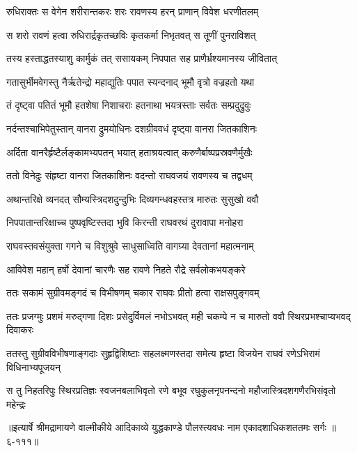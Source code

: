 \twolineshloka
{रुधिराक्तः स वेगेन शरीरान्तकरः शरः}
{रावणस्य हरन् प्राणान् विवेश धरणीतलम्} %

\twolineshloka
{स शरो रावणं हत्वा रुधिरार्द्रकृतच्छविः}
{कृतकर्मा निभृतवत् स तूणीं पुनराविशत्} %

\twolineshloka
{तस्य हस्ताद्धतस्याशु कार्मुकं तत् ससायकम्}
{निपपात सह प्राणैर्भ्रश्यमानस्य जीवितात्} %

\twolineshloka
{गतासुर्भीमवेगस्तु नैर्ऋतेन्द्रो महाद्युतिः}
{पपात स्यन्दनाद् भूमौ वृत्रो वज्रहतो यथा} %

\twolineshloka
{तं दृष्ट्वा पतितं भूमौ हतशेषा निशाचराः}
{हतनाथा भयत्रस्ताः सर्वतः सम्प्रदुद्रुवुः} %

\twolineshloka
{नर्दन्तश्चाभिपेतुस्तान् वानरा द्रुमयोधिनः}
{दशग्रीववधं दृष्ट्वा वानरा जितकाशिनः} %

\twolineshloka
{अर्दिता वानरैर्हृष्टैर्लङ्कामभ्यपतन् भयात्}
{हताश्रयत्वात् करुणैर्बाष्पप्रस्रवणैर्मुखैः} %

\twolineshloka
{ततो विनेदुः संहृष्टा वानरा जितकाशिनः}
{वदन्तो राघवजयं रावणस्य च तद्वधम्} %

\twolineshloka
{अथान्तरिक्षे व्यनदत् सौम्यस्त्रिदशदुन्दुभिः}
{दिव्यगन्धवहस्तत्र मारुतः सुसुखो ववौ} %

\twolineshloka
{निपपातान्तरिक्षाच्च पुष्पवृष्टिस्तदा भुवि}
{किरन्ती राघवरथं दुरावापा मनोहरा} %

\twolineshloka
{राघवस्तवसंयुक्ता गगने च विशुश्रुवे}
{साधुसाध्विति वागग्र्या देवतानां महात्मनाम्} %

\twolineshloka
{आविवेश महान् हर्षो देवानां चारणैः सह}
{रावणे निहते रौद्रे सर्वलोकभयङ्करे} %

\twolineshloka
{ततः सकामं सुग्रीवमङ्गदं च विभीषणम्}
{चकार राघवः प्रीतो हत्वा राक्षसपुङ्गवम्} %

\twolineshloka
{ततः प्रजग्मुः प्रशमं मरुद्गणा दिशः प्रसेदुर्विमलं नभोऽभवत्}
{मही चकम्पे न च मारुतो ववौ स्थिरप्रभश्चाप्यभवद् दिवाकरः} %

\twolineshloka
{ततस्तु सुग्रीवविभीषणाङ्गदाः सुहृद्विशिष्टाः सहलक्ष्मणस्तदा}
{समेत्य हृष्टा विजयेन राघवं रणेऽभिरामं विधिनाभ्यपूजयन्} %

\twolineshloka
{स तु निहतरिपुः स्थिरप्रतिज्ञः स्वजनबलाभिवृतो रणे बभूव}
{रघुकुलनृपनन्दनो महौजास्त्रिदशगणैरभिसंवृतो महेन्द्रः} %


॥इत्यार्षे श्रीमद्रामायणे वाल्मीकीये आदिकाव्ये युद्धकाण्डे पौलस्त्यवधः नाम एकादशाधिकशततमः सर्गः ॥६-१११॥
